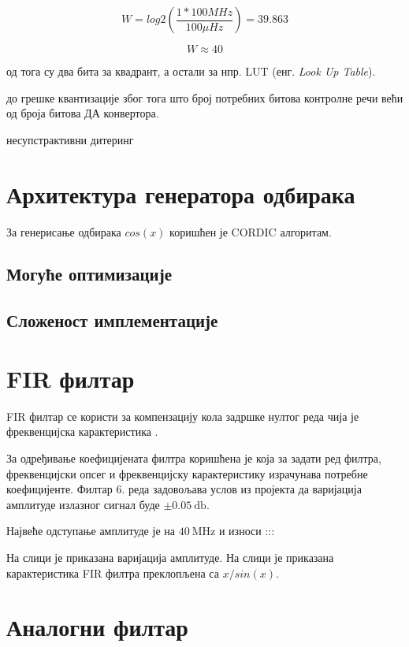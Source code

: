 \documentclass[conference]{IEEEJERM}
\begin{document}
\begin{equation}
W = log2\left(\dfrac{ 1 * 100 M Hz }{ 100 \mu Hz}\right) = 39.863 
\end{equation}

\begin{equation}
W \approx 40
\end{equation}

од тога су два бита за квадрант, а остали за нпр. LUT (енг. \textit{Look Up Table}).

до грешке квантизације због тога што број потребних битова контролне речи већи од броја битова ДА конвертора.

несупстрактивни дитеринг

\section{Архитектура генератора одбирака}

За генерисање одбирака  $cos(x)$ коришћен је CORDIC алгоритам. 


\subsection{Могуће оптимизације}

\subsection{Сложеност имплементације}


\section{FIR филтар}
FIR филтар се користи за компензацију кола задршке нултог реда чија је фреквенцијска карактеристика .

За одређивање коефицијената филтра коришћена је  која за задати ред филтра, фреквенцијски опсег и фреквенцијску карактеристику израчунава потребне коефицијенте. Филтар 6. реда задовољава услов из пројекта да варијација амплитуде излазног сигнал буде $\pm \SI{0.05}{\decibel}$.

Највеће одступање амплитуде је на $\SI{40}{\mega\hertz}$ и износи :::

На слици је приказана варијација амплитуде. На слици је приказана карактеристика FIR филтра преклопљена са $x/sin(x)$.
 
\section{Аналогни филтар}
\end{document}
